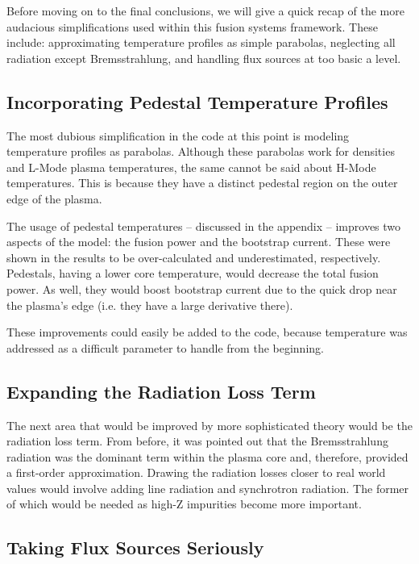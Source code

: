 Before moving on to the final conclusions, we will give a quick recap of the more audacious simplifications used within this fusion systems framework. These include: approximating temperature profiles as simple parabolas, neglecting all radiation except Bremsstrahlung, and handling flux sources at too basic a level.

\subsection{Incorporating Pedestal Temperature Profiles}

The most dubious simplification in the code at this point is modeling temperature profiles as parabolas. Although these parabolas work for densities and L-Mode plasma temperatures, the same cannot be said about H-Mode temperatures. This is because they have a distinct pedestal region on the outer edge of the plasma.

The usage of pedestal temperatures -- discussed in the appendix -- improves two aspects of the model: the fusion power and the bootstrap current. These were shown in the results to be over-calculated and underestimated, respectively. Pedestals, having a lower core temperature, would decrease the total fusion power. As well, they would boost bootstrap current due to the quick drop near the plasma's edge (i.e. they have a large derivative there). 

These improvements could easily be added to the code, because temperature was addressed as a difficult parameter to handle from the beginning.

\subsection{Expanding the Radiation Loss Term}

The next area that would be improved by more sophisticated theory would be the radiation loss term. From before, it was pointed out that the Bremsstrahlung radiation was the dominant term within the plasma core and, therefore, provided a first-order approximation. Drawing the radiation losses closer to real world values would involve adding line radiation and synchrotron radiation. The former of which would be needed as high-Z impurities become more important.

\subsection{Taking Flux Sources Seriously}

